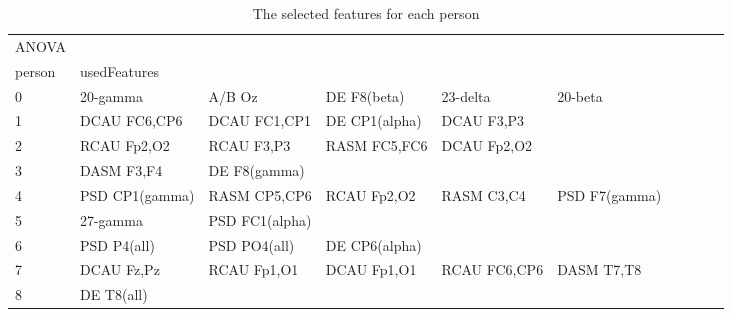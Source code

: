 \begin{landscape}
\begin{table}[]
\centering
\caption{The selected features for each person}
\begin{tabular}{l|llllllll}
ANOVA    &                &                &                &                &                &                &               &                &               &               \\
person   & usedFeatures   &                &                &                &                &                &               &                &               &               \\
0        & 20-gamma       & A/B Oz         & DE F8(beta)    & 23-delta       & 20-beta        &                &               &                &               &               \\
1        & DCAU FC6,CP6   & DCAU FC1,CP1   & DE CP1(alpha)  & DCAU F3,P3     &                &                &               &                &               &               \\
2        & RCAU Fp2,O2    & RCAU F3,P3     & RASM FC5,FC6   & DCAU Fp2,O2    &                &                &               &                &               &               \\
3        & DASM F3,F4     & DE F8(gamma)   &                &                &                &                &               &                &               &               \\
4        & PSD CP1(gamma) & RASM CP5,CP6   & RCAU Fp2,O2    & RASM C3,C4     & PSD F7(gamma)  &                &               &                &               &               \\
5        & 27-gamma       & PSD FC1(alpha) &                &                &                &                &               &                &               &               \\
6        & PSD P4(all)    & PSD PO4(all)   & DE CP6(alpha)  &                &                &                &               &                &               &               \\
7        & DCAU Fz,Pz     & RCAU Fp1,O1    & DCAU Fp1,O1    & RCAU FC6,CP6   & DASM T7,T8     &                &               &                &               &               \\
8        & DE T8(all)     &                &                &                &                &                &               &                &               &               \\

\end{tabular}
\end{table}
\end{landscape}
